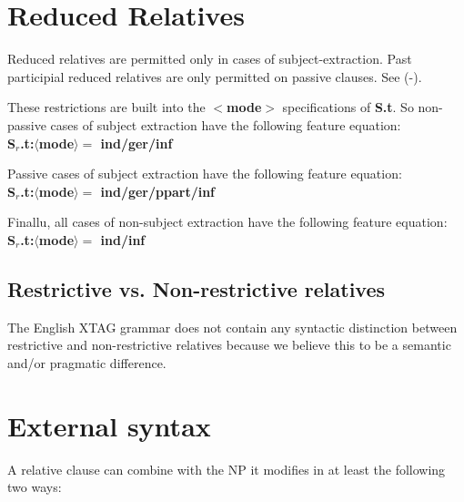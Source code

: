 
\section{Reduced Relatives}
Reduced relatives are permitted only in cases of subject-extraction.
Past participial reduced relatives are only permitted on passive
clauses.
See (-).


These restrictions are built into the {\bf $<$mode$>$} specifications
of {\bf S.t}. So non-passive cases of subject extraction have the following
feature equation:\\
{\bf S$_{r}$.t:$\langle$mode$\rangle =$ ind/ger/inf}

Passive cases of subject extraction have the following
feature equation:\\
{\bf S$_{r}$.t:$\langle$mode$\rangle =$ ind/ger/ppart/inf}

Finallu, all cases of non-subject extraction have the following
feature equation:\\
{\bf S$_{r}$.t:$\langle$mode$\rangle =$ ind/inf}\\

\subsection{Restrictive vs. Non-restrictive relatives}

The English XTAG grammar does not contain any  syntactic distinction between
restrictive and non-restrictive relatives because we believe this to
be a semantic and/or pragmatic difference.

\section{External syntax}
A relative clause can combine with the NP it modifies in at least 
the following two ways:

